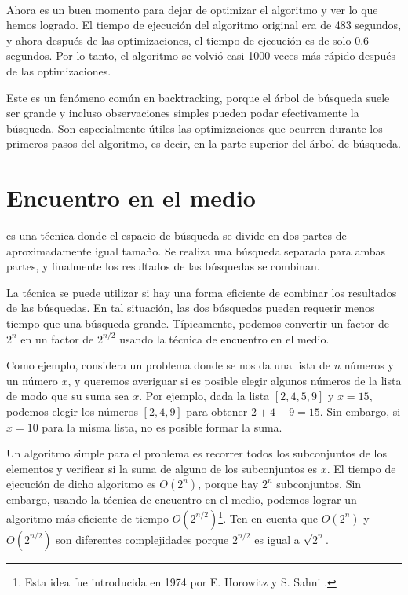 ~\\
Ahora es un buen momento para dejar de optimizar
el algoritmo y ver lo que hemos logrado.
El tiempo de ejecución del algoritmo original
era de 483 segundos,
y ahora después de las optimizaciones,
el tiempo de ejecución es de solo 0.6 segundos.
Por lo tanto, el algoritmo se volvió casi 1000 veces
más rápido después de las optimizaciones.

Este es un fenómeno común en backtracking,
porque el árbol de búsqueda suele ser grande
y incluso observaciones simples pueden podar efectivamente
la búsqueda.
Son especialmente útiles las optimizaciones que
ocurren durante los primeros pasos del algoritmo,
es decir, en la parte superior del árbol de búsqueda.

\section{Encuentro en el medio}


 es una técnica
donde el espacio de búsqueda se divide en
dos partes de aproximadamente igual tamaño.
Se realiza una búsqueda separada
para ambas partes,
y finalmente los resultados de las búsquedas se combinan.

La técnica se puede utilizar
si hay una forma eficiente de combinar los
resultados de las búsquedas.
En tal situación, las dos búsquedas pueden requerir menos
tiempo que una búsqueda grande.
Típicamente, podemos convertir un factor de $2^n$
en un factor de $2^{n/2}$ usando la técnica de encuentro en el
medio.

Como ejemplo, considera un problema donde
se nos da una lista de $n$ números y
un número $x$,
y queremos averiguar si es posible
elegir algunos números de la lista de modo que
su suma sea $x$.
Por ejemplo, dada la lista $[2,4,5,9]$ y $x=15$,
podemos elegir los números $[2,4,9]$ para obtener $2+4+9=15$.
Sin embargo, si $x=10$ para la misma lista,
no es posible formar la suma.

Un algoritmo simple para el problema es recorrer
todos los subconjuntos de los elementos y
verificar si la suma de alguno de los subconjuntos es $x$.
El tiempo de ejecución de dicho algoritmo es $O(2^n)$,
porque hay $2^n$ subconjuntos.
Sin embargo, usando la técnica de encuentro en el medio,
podemos lograr un algoritmo más eficiente de tiempo $O(2^{n/2})$\footnote{Esta
  idea fue introducida en 1974 por E. Horowitz y S. Sahni \cite{hor74}.}.
Ten en cuenta que $O(2^n)$ y $O(2^{n/2})$ son diferentes
complejidades porque $2^{n/2}$ es igual a $\sqrt{2^n}$.

